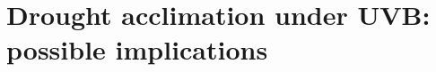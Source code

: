 \documentclass[10pt]{beamer}\usepackage[]{graphicx}\usepackage[]{xcolor}
\begin{document}
%


\section[Drought acclimation under UVB: possible implications]{Drought acclimation under UVB:\\ possible implications}
\end{document}
